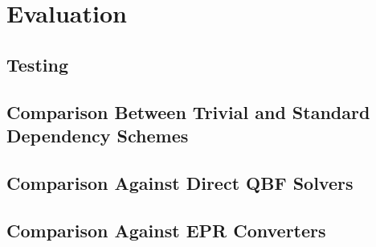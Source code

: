 \chapter{Evaluation} \label{evaluation}

\section{Testing}

\section{Comparison Between Trivial and Standard Dependency Schemes} \label{trivialvsstd}

\section{Comparison Against Direct QBF Solvers}

\section{Comparison Against EPR Converters}
